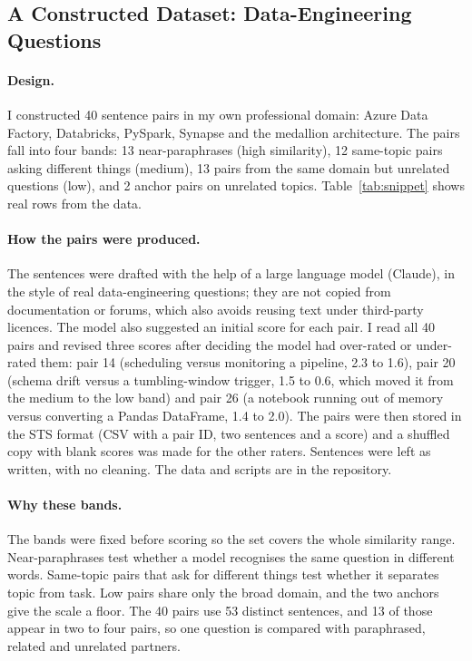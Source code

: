 \documentclass[11pt]{article}
\begin{document}
\subsection{A Constructed Dataset: Data-Engineering Questions}
\paragraph{Design.}
I constructed 40 sentence pairs in my own professional domain: Azure Data Factory, Databricks, PySpark, Synapse and the medallion architecture. The pairs fall into four bands: 13 near-paraphrases (high similarity), 12 same-topic pairs asking different things (medium), 13 pairs from the same domain but unrelated questions (low), and 2 anchor pairs on unrelated topics. Table~\ref{tab:snippet} shows real rows from the data.

\paragraph{How the pairs were produced.}
The sentences were drafted with the help of a large language model (Claude), in the style of real data-engineering questions; they are not copied from documentation or forums, which also avoids reusing text under third-party licences. The model also suggested an initial score for each pair. I read all 40 pairs and revised three scores after deciding the model had over-rated or under-rated them: pair 14 (scheduling versus monitoring a pipeline, 2.3 to 1.6), pair 20 (schema drift versus a tumbling-window trigger, 1.5 to 0.6, which moved it from the medium to the low band) and pair 26 (a notebook running out of memory versus converting a Pandas DataFrame, 1.4 to 2.0). The pairs were then stored in the STS format (CSV with a pair ID, two sentences and a score) and a shuffled copy with blank scores was made for the other raters. Sentences were left as written, with no cleaning. The data and scripts are in the repository.

\paragraph{Why these bands.}
The bands were fixed before scoring so the set covers the whole similarity range. Near-paraphrases test whether a model recognises the same question in different words. Same-topic pairs that ask for different things test whether it separates topic from task. Low pairs share only the broad domain, and the two anchors give the scale a floor. The 40 pairs use 53 distinct sentences, and 13 of those appear in two to four pairs, so one question is compared with paraphrased, related and unrelated partners.
\end{document}
